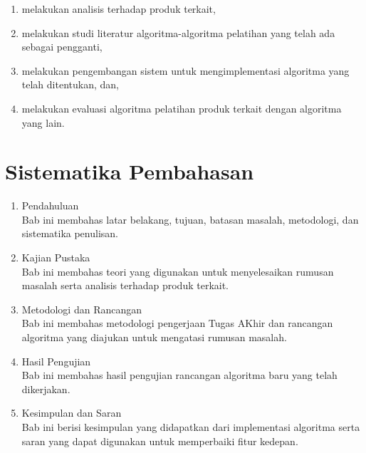 \begin{enumerate}
	\item melakukan analisis terhadap produk terkait,
	\item melakukan studi literatur algoritma-algoritma pelatihan yang telah ada sebagai pengganti,
	\item melakukan pengembangan sistem untuk mengimplementasi algoritma yang telah ditentukan, dan,
	\item melakukan evaluasi algoritma pelatihan produk terkait dengan algoritma yang lain. 
\end{enumerate}

\section{Sistematika Pembahasan}

\begin{enumerate}[label=Bab \arabic*,itemindent=*]
	\item Pendahuluan\\
	Bab ini membahas latar belakang, tujuan, batasan masalah, metodologi, dan sistematika penulisan.
	\item Kajian Pustaka\\
	Bab ini membahas teori yang digunakan untuk menyelesaikan rumusan masalah serta analisis terhadap produk terkait.
	\item Metodologi dan Rancangan\\
	Bab ini membahas metodologi pengerjaan Tugas AKhir dan rancangan algoritma yang diajukan untuk mengatasi rumusan masalah.
	\item Hasil Pengujian\\
	Bab ini membahas hasil pengujian rancangan algoritma baru yang telah dikerjakan.
	\item Kesimpulan dan Saran\\
	Bab ini berisi kesimpulan yang didapatkan dari implementasi algoritma serta saran yang dapat digunakan untuk memperbaiki fitur kedepan.
\end{enumerate}
